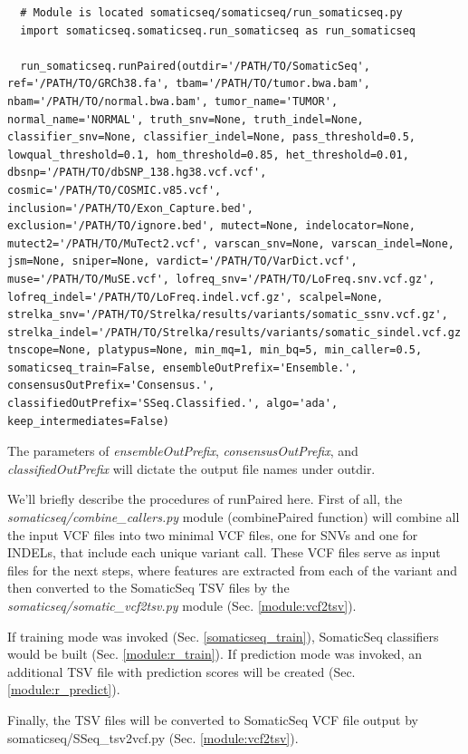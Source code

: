 \documentclass[10pt,letterpaper]{article}
\begin{document}
\begin{sloppypar}
\begin{lstlisting}
  # Module is located somaticseq/somaticseq/run_somaticseq.py
  import somaticseq.somaticseq.run_somaticseq as run_somaticseq
  
  run_somaticseq.runPaired(outdir='/PATH/TO/SomaticSeq', ref='/PATH/TO/GRCh38.fa', tbam='/PATH/TO/tumor.bwa.bam', nbam='/PATH/TO/normal.bwa.bam', tumor_name='TUMOR', normal_name='NORMAL', truth_snv=None, truth_indel=None, classifier_snv=None, classifier_indel=None, pass_threshold=0.5, lowqual_threshold=0.1, hom_threshold=0.85, het_threshold=0.01, dbsnp='/PATH/TO/dbSNP_138.hg38.vcf.vcf', cosmic='/PATH/TO/COSMIC.v85.vcf', inclusion='/PATH/TO/Exon_Capture.bed', exclusion='/PATH/TO/ignore.bed', mutect=None, indelocator=None, mutect2='/PATH/TO/MuTect2.vcf', varscan_snv=None, varscan_indel=None, jsm=None, sniper=None, vardict='/PATH/TO/VarDict.vcf', muse='/PATH/TO/MuSE.vcf', lofreq_snv='/PATH/TO/LoFreq.snv.vcf.gz', lofreq_indel='/PATH/TO/LoFreq.indel.vcf.gz', scalpel=None, strelka_snv='/PATH/TO/Strelka/results/variants/somatic_ssnv.vcf.gz', strelka_indel='/PATH/TO/Strelka/results/variants/somatic_sindel.vcf.gz', tnscope=None, platypus=None, min_mq=1, min_bq=5, min_caller=0.5, somaticseq_train=False, ensembleOutPrefix='Ensemble.', consensusOutPrefix='Consensus.', classifiedOutPrefix='SSeq.Classified.', algo='ada', keep_intermediates=False)
\end{lstlisting}

The parameters of \emph{ensembleOutPrefix}, \emph{consensusOutPrefix}, and \emph{classifiedOutPrefix} will dictate the output file names under outdir.


We'll briefly describe the procedures of runPaired here. First of all, the \emph{somaticseq/combine\_callers.py} module (combinePaired function) will combine all the input VCF files into two minimal VCF files, one for SNVs and one for INDELs, that include each unique variant call. These VCF files serve as input files for the next steps, where features are extracted from each of the variant and then converted to the SomaticSeq TSV files by the \emph{somaticseq/somatic\_vcf2tsv.py} module (Sec. \ref{module:vcf2tsv}).

If training mode was invoked (Sec. \ref{somaticseq_train}), SomaticSeq classifiers would be built (Sec. \ref{module:r_train}). If prediction mode was invoked, an additional TSV file with prediction scores will be created (Sec. \ref{module:r_predict}). 

Finally, the TSV files will be converted to SomaticSeq VCF file output by somaticseq/SSeq\_tsv2vcf.py (Sec. \ref{module:vcf2tsv}). 




\end{sloppypar}
\end{document}
